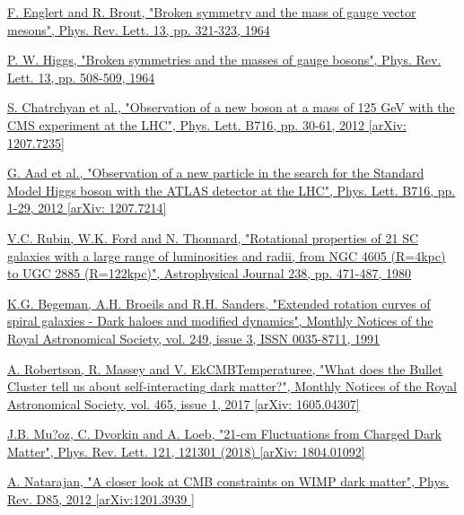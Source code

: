 \documentclass[a4paper, 10pt, openright]{report}
\begin{document}

\begin{thebibliography}{1}

\href{https://journals.aps.org/prl/abstract/10.1103/PhysRevLett.13.321}{F. Englert and R. Brout, 
"Broken symmetry and the mass of gauge vector mesons",
Phys. Rev. Lett. 13, pp. 321-323, 1964}

\href{https://journals.aps.org/prl/abstract/10.1103/PhysRevLett.13.508}{P. W. Higgs, 
"Broken symmetries and the masses of gauge bosons",
Phys. Rev. Lett. 13, pp. 508-509, 1964}

\href{https://arxiv.org/abs/1207.7235}{S. Chatrchyan et al.,
"Observation of a new boson at a mass of 125 GeV with the CMS experiment at the LHC",
Phys. Lett. B716, pp. 30-61, 2012 [arXiv: 1207.7235]
}

\href{https://arxiv.org/abs/1207.7214}{G. Aad et al.,
"Observation of a new particle in the search for the Standard Model Higgs boson with the ATLAS detector at the LHC", 
Phys. Lett. B716, pp. 1-29, 2012 [arXiv: 1207.7214]}

\href{https://ui.adsabs.harvard.edu/abs/1980ApJ...238..471R/abstract}{V.C. Rubin, W.K. Ford and N. Thonnard,
"Rotational properties of 21 SC galaxies with a large range of luminosities and radii, from NGC 4605 (R=4kpc) to UGC 2885 (R=122kpc)",
Astrophysical Journal 238, pp. 471-487, 1980}

\href{https://academic.oup.com/mnras/article/249/3/523/1005565}{K.G. Begeman, A.H. Broeils and R.H. Sanders,
"Extended rotation curves of spiral galaxies - Dark haloes and modified dynamics",
Monthly Notices of the Royal Astronomical Society, vol. 249, issue 3, ISSN 0035-8711, 1991}

\href{https://arxiv.org/abs/1605.04307}{A. Robertson, R. Massey and V. EkCMBTemperaturee,
"What does the Bullet Cluster tell us about self-interacting dark matter?",
Monthly Notices of the Royal Astronomical Society, vol. 465, issue 1, 2017 [arXiv: 1605.04307]}

\href{https://arxiv.org/abs/1804.01092}{J.B. Mu?oz, C. Dvorkin and A. Loeb,
"21-cm Fluctuations from Charged Dark Matter",
Phys. Rev. Lett. 121, 121301 (2018) [arXiv: 1804.01092]}

\href{https://arxiv.org/abs/1201.3939}{A. Natarajan,
"A closer look at CMB constraints on WIMP dark matter",
Phys. Rev. D85, 2012 [arXiv:1201.3939 ]}


\end{thebibliography}
\end{document}
